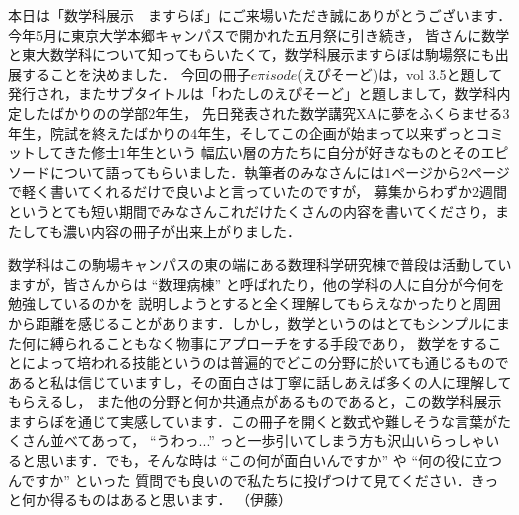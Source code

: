 本日は「数学科展示　ますらぼ」にご来場いただき誠にありがとうございます．今年5月に東京大学本郷キャンパスで開かれた五月祭に引き続き，
皆さんに数学と東大数学科について知ってもらいたくて，数学科展示ますらぼは駒場祭にも出展することを決めました．
今回の冊子$e\pi isode$(えぴそーど)は，vol 3.5と題して発行され，またサブタイトルは「わたしのえぴそーど」と題しまして，数学科内定したばかりのの学部$2$年生，
先日発表された数学講究XAに夢をふくらませる$3$年生，院試を終えたばかりの$4$年生，そしてこの企画が始まって以来ずっとコミットしてきた修士$1$年生という
幅広い層の方たちに自分が好きなものとそのエピソードについて語ってもらいました．執筆者のみなさんには$1$ページから$2$ページで軽く書いてくれるだけで良いよと言っていたのですが，
募集からわずか$2$週間というとても短い期間でみなさんこれだけたくさんの内容を書いてくださり，またしても濃い内容の冊子が出来上がりました．

数学科はこの駒場キャンパスの東の端にある数理科学研究棟で普段は活動していますが，皆さんからは ``数理病棟'' と呼ばれたり，他の学科の人に自分が今何を勉強しているのかを
説明しようとすると全く理解してもらえなかったりと周囲から距離を感じることがあります．しかし，数学というのはとてもシンプルにまた何に縛られることもなく物事にアプローチをする手段であり，
数学をすることによって培われる技能というのは普遍的でどこの分野に於いても通じるものであると私は信じていますし，その面白さは丁寧に話しあえば多くの人に理解してもらえるし，
また他の分野と何か共通点があるものであると，この数学科展示ますらぼを通じて実感しています．この冊子を開くと数式や難しそうな言葉がたくさん並べてあって，
``うわっ...'' っと一歩引いてしまう方も沢山いらっしゃいると思います．でも，そんな時は ``この何が面白いんですか'' や ``何の役に立つんですか'' といった
質問でも良いので私たちに投げつけて見てください．きっと何か得るものはあると思います．
（伊藤）

